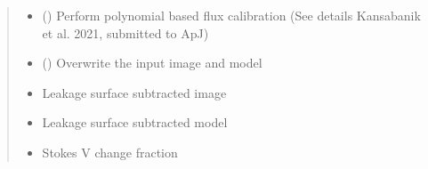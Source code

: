 \documentclass[letterpaper,10pt,english]{sphinxmanual}
\begin{document}
\begin{fulllineitems}
\begin{fulllineitems}
\begin{quote}
\begin{description}
\begin{itemize}
\item {} 
\sphinxAtStartPar
{} () \textendash{} Perform polynomial based flux calibration (See details Kansabanik et al. 2021, submitted to ApJ)

\item {} 
\sphinxAtStartPar
{} () \textendash{} Overwrite the input image and model

\end{itemize}

\item[{Returns}] \leavevmode
\sphinxAtStartPar
\begin{itemize}
\item {} 
\sphinxAtStartPar
{} \textendash{} Leakage surface subtracted image

\item {} 
\sphinxAtStartPar
{} \textendash{} Leakage surface subtracted model

\item {} 
\sphinxAtStartPar
{} \textendash{} Stokes V change fraction

\end{itemize}


\end{description}\end{quote}

\end{fulllineitems}



\end{fulllineitems}
\end{document}

